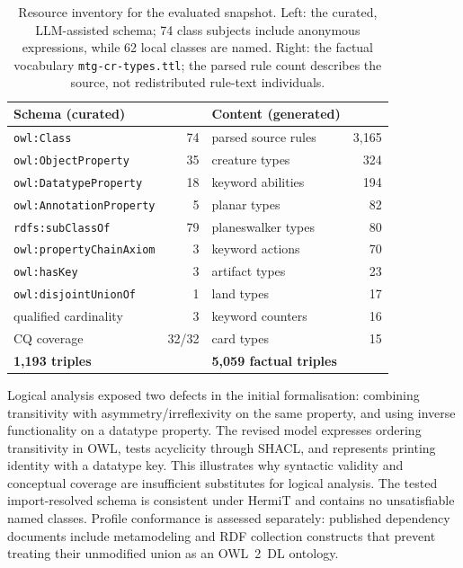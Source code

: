 \documentclass[11pt,a4paper]{article}
\begin{document}
\begin{table}[h]
\centering
\small
\begin{tabular}{lr@{\hskip 2em}lr}
\toprule
\textbf{Schema (curated)} & & \textbf{Content (generated)} & \\
\midrule
\texttt{owl:Class}              & 74 & parsed source rules        & 3{,}165 \\
\texttt{owl:ObjectProperty}     & 35 & creature types             &     324 \\
\texttt{owl:DatatypeProperty}   & 18 & keyword abilities          &     194 \\
\texttt{owl:AnnotationProperty} &  5 & planar types               &      82 \\
\texttt{rdfs:subClassOf}        & 79 & planeswalker types         &      80 \\
\texttt{owl:propertyChainAxiom} &  3 & keyword actions            &      70 \\
\texttt{owl:hasKey}             &  3 & artifact types             &      23 \\
\texttt{owl:disjointUnionOf}    &  1 & land types                 &      17 \\
qualified cardinality           &  3 & keyword counters           &      16 \\
CQ coverage                     & 32/32 & card types              &      15 \\
\midrule
\textbf{1{,}193 triples} & & \textbf{5{,}059 factual triples} & \\
\bottomrule
\end{tabular}
\caption{Resource inventory for the evaluated snapshot. Left: the curated, LLM-assisted schema; 74 class subjects include anonymous expressions, while 62 local classes are named. Right: the factual vocabulary \texttt{mtg-cr-types.ttl}; the parsed rule count describes the source, not redistributed rule-text individuals.}
\label{tab:stats}
\end{table}

Logical analysis exposed two defects in the initial formalisation: combining transitivity with asymmetry/irreflexivity on the same property, and using inverse functionality on a datatype property. The revised model expresses ordering transitivity in OWL, tests acyclicity through SHACL, and represents printing identity with a datatype key. This illustrates why syntactic validity and conceptual coverage are insufficient substitutes for logical analysis. The tested import-resolved schema is consistent under HermiT and contains no unsatisfiable named classes. Profile conformance is assessed separately: published dependency documents include metamodeling and RDF collection constructs that prevent treating their unmodified union as an OWL~2~DL ontology.
\end{document}

